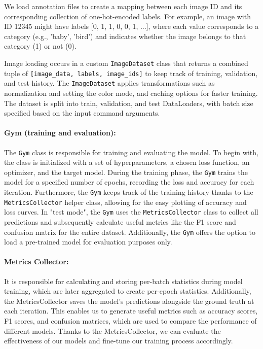 \documentclass[a4paper, 12pt]{article}
\begin{document}
We load annotation files to create a mapping between each image ID and its corresponding collection of one-hot-encoded labels. For example, an image with ID 12345 might have labels [0, 1, 1, 0, 0, 1, ...], where each value corresponds to a category (e.g., 'baby', 'bird') and indicates whether the image belongs to that category (1) or not (0).

Image loading occurs in a custom \texttt{ImageDataset} class that returns a combined tuple of \texttt{[image\_data, labels, image\_ids]} to keep track of training, validation, and test history. The \texttt{ImageDataset} applies transformations such as normalization and setting the color mode, and caching options for faster training. The dataset is split into train, validation, and test DataLoaders, with batch size specified based on the input command arguments.

\paragraph{Gym (training and evaluation):} 
The \texttt{Gym} class is responsible for training and evaluating the model. To begin with, the class is initialized with a set of hyperparameters, a chosen loss function, an optimizer, and the target model. During the training phase, the \texttt{Gym} trains the model for a specified number of epochs, recording the loss and accuracy for each iteration. Furthermore, the \texttt{Gym} keeps track of the training history thanks to the \texttt{MetricsCollector} helper class, allowing for the easy plotting of accuracy and loss curves. In "test mode", the \texttt{Gym} uses the \texttt{MetricsCollector} class to collect all predictions and subsequently calculate useful metrics like the F1 score and confusion matrix for the entire dataset. Additionally, the \texttt{Gym} offers the option to load a pre-trained model for evaluation purposes only.

\paragraph{Metrics Collector:} 
It is responsible for calculating and storing per-batch statistics during model training, which are later aggregated to create per-epoch statistics. Additionally, the MetricsCollector saves the model's predictions alongside the ground truth at each iteration. This enables us to generate useful metrics such as accuracy scores, F1 scores, and confusion matrices, which are used to compare the performance of different models. Thanks to the MetricsCollector, we can evaluate the effectiveness of our models and fine-tune our training process accordingly.
\end{document}
